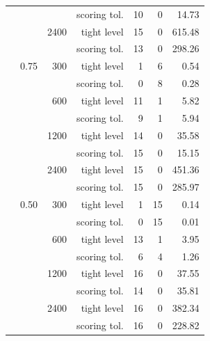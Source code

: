 \begin{tabular}{@{}l c r r r r r@{}}
 &  &  & scoring tol. & 10 & 0 & 14.73 \\
 &  & 2400 & tight level & 15 & 0 & 615.48 \\
 &  &  & scoring tol. & 13 & 0 & 298.26 \\
 & 0.75 & 300 & tight level & 1 & 6 & 0.54 \\
 &  &  & scoring tol. & 0 & 8 & 0.28 \\
 &  & 600 & tight level & 11 & 1 & 5.82 \\
 &  &  & scoring tol. & 9 & 1 & 5.94 \\
 &  & 1200 & tight level & 14 & 0 & 35.58 \\
 &  &  & scoring tol. & 15 & 0 & 15.15 \\
 &  & 2400 & tight level & 15 & 0 & 451.36 \\
 &  &  & scoring tol. & 15 & 0 & 285.97 \\
 & 0.50 & 300 & tight level & 1 & 15 & 0.14 \\
 &  &  & scoring tol. & 0 & 15 & 0.01 \\
 &  & 600 & tight level & 13 & 1 & 3.95 \\
 &  &  & scoring tol. & 6 & 4 & 1.26 \\
 &  & 1200 & tight level & 16 & 0 & 37.55 \\
 &  &  & scoring tol. & 14 & 0 & 35.81 \\
 &  & 2400 & tight level & 16 & 0 & 382.34 \\
 &  &  & scoring tol. & 16 & 0 & 228.82 \\
\bottomrule
\end{tabular}
